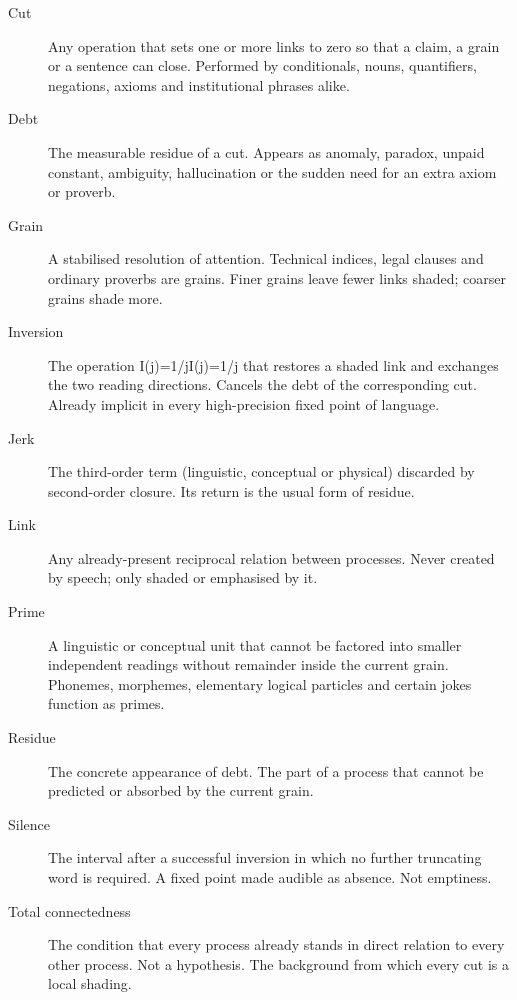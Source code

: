 \documentclass[11pt,a4paper]{article}
\begin{document}
\begin{description} \item[Cut] Any operation that sets one or more links to zero so that a claim, a grain or a sentence can close. Performed by conditionals, nouns, quantifiers, negations, axioms and institutional phrases alike.

\item[Debt] The measurable residue of a cut. Appears as anomaly, paradox, unpaid constant, ambiguity, hallucination or the sudden need for an extra axiom or proverb.

\item[Grain] A stabilised resolution of attention. Technical indices, legal clauses and ordinary proverbs are grains. Finer grains leave fewer links shaded; coarser grains shade more.

\item[Inversion] The operation I(j)=1/jI(j)=1/j that restores a shaded link and exchanges the two reading directions. Cancels the debt of the corresponding cut. Already implicit in every high-precision fixed point of language.

\item[Jerk] The third-order term (linguistic, conceptual or physical) discarded by second-order closure. Its return is the usual form of residue.

\item[Link] Any already-present reciprocal relation between processes. Never created by speech; only shaded or emphasised by it.

\item[Prime] A linguistic or conceptual unit that cannot be factored into smaller independent readings without remainder inside the current grain. Phonemes, morphemes, elementary logical particles and certain jokes function as primes.

\item[Residue] The concrete appearance of debt. The part of a process that cannot be predicted or absorbed by the current grain.

\item[Silence] The interval after a successful inversion in which no further truncating word is required. A fixed point made audible as absence. Not emptiness.

\item[Total connectedness] The condition that every process already stands in direct relation to every other process. Not a hypothesis. The background from which every cut is a local shading. \end{description}
\end{document}
